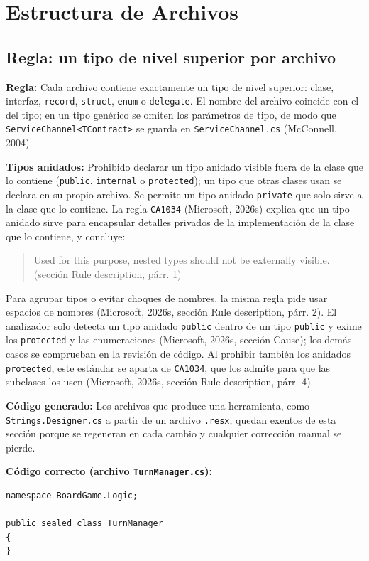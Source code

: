 \section{Estructura de Archivos}

\subsection{Regla: un tipo de nivel superior por archivo}

\textbf{Regla:} Cada archivo contiene exactamente un tipo de nivel superior: clase, interfaz, \texttt{record}, \texttt{struct}, \texttt{enum} o \texttt{delegate}. El nombre del archivo coincide con el del tipo; en un tipo genérico se omiten los parámetros de tipo, de modo que \texttt{ServiceChannel<TContract>} se guarda en \texttt{ServiceChannel.cs} (McConnell, 2004).

\textbf{Tipos anidados:} Prohibido declarar un tipo anidado visible fuera de la clase que lo contiene (\texttt{public}, \texttt{internal} o \texttt{protected}); un tipo que otras clases usan se declara en su propio archivo. Se permite un tipo anidado \texttt{private} que solo sirve a la clase que lo contiene. La regla \texttt{CA1034} (Microsoft, 2026s) explica que un tipo anidado sirve para encapsular detalles privados de la implementación de la clase que lo contiene, y concluye:
\begin{quote}
Used for this purpose, nested types should not be externally visible. (sección Rule description, párr. 1)
\end{quote}
\noindent Para agrupar tipos o evitar choques de nombres, la misma regla pide usar espacios de nombres (Microsoft, 2026s, sección Rule description, párr. 2). El analizador solo detecta un tipo anidado \texttt{public} dentro de un tipo \texttt{public} y exime los \texttt{protected} y las enumeraciones (Microsoft, 2026s, sección Cause); los demás casos se comprueban en la revisión de código. Al prohibir también los anidados \texttt{protected}, este estándar se aparta de \texttt{CA1034}, que los admite para que las subclases los usen (Microsoft, 2026s, sección Rule description, párr. 4).

\textbf{Código generado:} Los archivos que produce una herramienta, como \texttt{Strings.Designer.cs} a partir de un archivo \texttt{.resx}, quedan exentos de esta sección porque se regeneran en cada cambio y cualquier corrección manual se pierde.

\textbf{Código correcto (archivo \texttt{TurnManager.cs}):}
\begin{lstlisting}[style=csharpstyle]
namespace BoardGame.Logic;

public sealed class TurnManager
{
}
\end{lstlisting}

